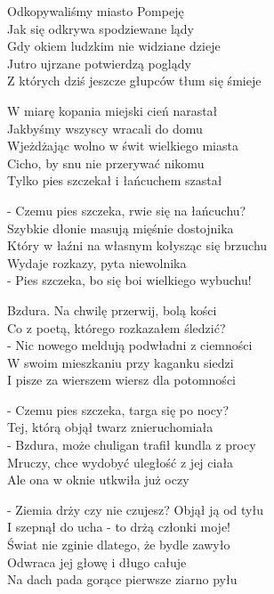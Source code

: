 \begin{text}
    Odkopywaliśmy miasto Pompeję\\
    Jak się odkrywa spodziewane lądy\\
    Gdy okiem ludzkim nie widziane dzieje\\
    Jutro ujrzane potwierdzą poglądy\\
    Z których dziś jeszcze głupców tłum się śmieje

    W miarę kopania miejski cień narastał\\
    Jakbyśmy wszyscy wracali do domu\\
    Wjeżdżając wolno w świt wielkiego miasta\\
    Cicho, by snu nie przerywać nikomu\\
    Tylko pies szczekał i łańcuchem szastał

    - Czemu pies szczeka, rwie się na łańcuchu?\\
    Szybkie dłonie masują mięśnie dostojnika\\
    Który w łaźni na własnym kołysząc się brzuchu\\
    Wydaje rozkazy, pyta niewolnika\\
    - Pies szczeka, bo się boi wielkiego wybuchu!

    Bzdura. Na chwilę przerwij, bolą kości\\
    Co z poetą, którego rozkazałem śledzić?\\
    - Nic nowego meldują podwładni z ciemności\\
    W swoim mieszkaniu przy kaganku siedzi\\
    I pisze za wierszem wiersz dla potomności

    - Czemu pies szczeka, targa się po nocy?\\
    Tej, którą objął twarz znieruchomiała\\
    - Bzdura, może chuligan trafił kundla z procy\\
    Mruczy, chce wydobyć uległość z jej ciała\\
    Ale ona w oknie utkwiła już oczy

    - Ziemia drży czy nie czujesz? Objął ją od tyłu\\
    I szepnął do ucha - to drżą członki moje!\\
    Świat nie zginie dlatego, że bydle zawyło\\
    Odwraca jej głowę i długo całuje\\
    Na dach pada gorące pierwsze ziarno pyłu


\end{text}
